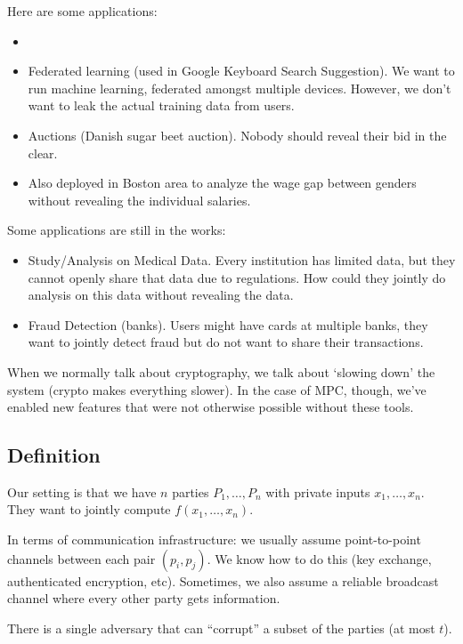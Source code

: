 Here are some applications:
\begin{itemize}
    \item {}
    \item Federated learning (used in Google Keyboard Search Suggestion). We want to run machine learning, federated amongst multiple devices. However, we don't want to leak the actual training data from users.
    \item Auctions (Danish sugar beet auction). Nobody should reveal their bid in the clear.
    \item Also deployed in Boston area to analyze the wage gap between genders without revealing the individual salaries.
\end{itemize}
Some applications are still in the works:
\begin{itemize}
    \item Study/Analysis on Medical Data. Every institution has limited data, but they cannot openly share that data due to regulations. How could they jointly do analysis on this data without revealing the data.
    \item Fraud Detection (banks). Users might have cards at multiple banks, they want to jointly detect fraud but do not want to share their transactions.
\end{itemize}

When we normally talk about cryptography, we talk about `slowing down' the system (crypto makes everything slower). In the case of MPC, though, we've enabled new features that were not otherwise possible without these tools.

\subsection{Definition}
Our setting is that we have $n$ parties $P_1, \dots, P_n$ with private inputs $x_1, \dots, x_n$. They want to jointly compute $f(x_1, \dots, x_n)$.

In terms of communication infrastructure: we usually assume point-to-point channels between each pair $(p_i, p_j)$. We know how to do this (key exchange, authenticated encryption, etc). Sometimes, we also assume a reliable broadcast channel where every other party gets information.

There is a single adversary that can ``corrupt'' a subset of the parties (at most $t$).

